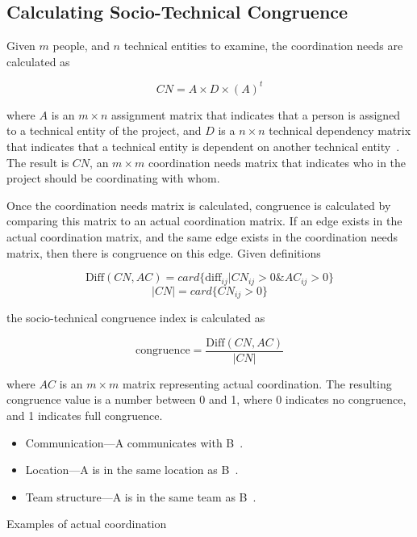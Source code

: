 \subsection{Calculating Socio-Technical Congruence}
\label{sec:stc}
Given $m$ people, and $n$ technical entities to examine, the coordination needs are calculated as 

\[ CN = A \times D \times (A)^t \]

\noindent where $A$ is an $m \times n$ assignment matrix that indicates that a person is assigned to a technical entity of the project, and $D$ is a $n \times n$ technical dependency matrix that indicates that a technical entity is dependent on another technical entity~\cite{cataldo:cscw:2006}. The result is $CN$, an $m \times m$ coordination needs matrix that indicates who in the project should be coordinating with whom.

Once the coordination needs matrix is calculated, congruence is calculated by comparing this matrix to an actual coordination matrix. If an edge exists in the actual coordination matrix, and the same edge exists in the coordination needs matrix, then there is congruence on this edge. Given definitions

\[ \text{Diff}(CN, AC) = card\{ \text{diff}_{ij} | CN_{ij} > 0 \& AC_{ij} > 0 \} \]
\[|CN| = card \{ CN_{ij} > 0 \} \]

\noindent the socio-technical congruence index is calculated as~\cite{cataldo:esem:2008}

\[ \text{congruence} = \frac{\text{Diff}(CN, AC)}  {|CN|} \]

\noindent where $AC$ is an $m \times m$ matrix representing actual coordination. The resulting congruence value is a number between 0 and 1, where 0 indicates no congruence, and 1 indicates full congruence.

\begin{placeholder}[t]
\begin{itemize}
\item Communication---A communicates with B~\cite{cataldo:cscw:2006, ehrlich2008:gaps, cataldo:esem:2008,damian2007:collaboration}.
\item Location---A is in the same location as B~\cite{cataldo:cscw:2006, ehrlich2008:gaps}.
\item Team structure---A is in the same team as B~\cite{cataldo:cscw:2006}.
\end{itemize}
\caption{Examples of actual coordination}
\label{ph:relationships}
\end{placeholder}



